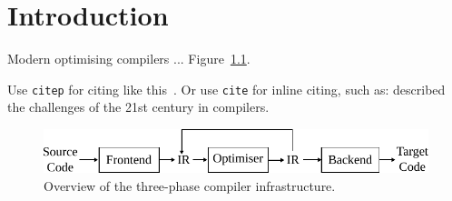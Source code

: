 
\chapter{Introduction}

Modern optimising compilers ... Figure~\ref{fig:3-phase-compiler}.

Use \texttt{citep} for citing like this~\citep{cooper02}.
Or use \texttt{cite} for inline citing, such as: \cite{cooper02} described the challenges of the 21st century in compilers.

\begin{figure}[htb]
    \centering
    \includegraphics[width=\linewidth]{figs/3-phase-compiler.pdf}
    \caption{Overview of the three-phase compiler infrastructure.}
    \label{fig:3-phase-compiler}
\end{figure}

